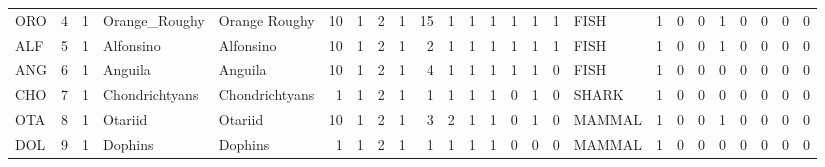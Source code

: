 \documentclass[11pt]{article}
\begin{document}
\begin{table}[htb]
\begin{center}
\begin{tabular}{lrrllrrrrrrrrrrrlrrrrrrrr}
 ORO   &      4  &           1  &  Orange_Roughy         &  Orange Roughy         &          10  &             1  &          2  &          1  &               15  &          1  &                1  &                  1  &         1  &           1  &      1  &  FISH          &           1  &        0  &             0  &           1  &              0  &             0  &           0  &            0  \\
 ALF   &      5  &           1  &  Alfonsino             &  Alfonsino             &          10  &             1  &          2  &          1  &                2  &          1  &                1  &                  1  &         1  &           1  &      1  &  FISH          &           1  &        0  &             0  &           1  &              0  &             0  &           0  &            0  \\
 ANG   &      6  &           1  &  Anguila               &  Anguila               &          10  &             1  &          2  &          1  &                4  &          1  &                1  &                  1  &         1  &           1  &      0  &  FISH          &           1  &        0  &             0  &           0  &              0  &             0  &           0  &            0  \\
 CHO   &      7  &           1  &  Chondrichtyans        &  Chondrichtyans        &           1  &             1  &          2  &          1  &                1  &          1  &                1  &                  1  &         0  &           1  &      0  &  SHARK         &           1  &        0  &             0  &           0  &              0  &             0  &           0  &            0  \\
 OTA   &      8  &           1  &  Otariid               &  Otariid               &          10  &             1  &          2  &          1  &                3  &          2  &                1  &                  1  &         0  &           1  &      0  &  MAMMAL        &           1  &        0  &             0  &           1  &              0  &             0  &           0  &            0  \\
 DOL   &      9  &           1  &  Dophins               &  Dophins               &           1  &             1  &          2  &          1  &                1  &          1  &                1  &                  1  &         0  &           0  &      0  &  MAMMAL        &           1  &        0  &             0  &           0  &              0  &             0  &           0  &            0  \\

\end{tabular}
\end{center}
\end{table}
\end{document}
